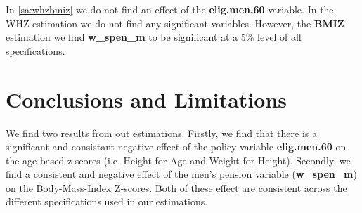 \begin{refsection}
In \autoref{sa:whzbmiz} we do not find an effect of the \textbf{elig.men.60} variable.
In the WHZ estimation we do not find any significant variables.
However, the \textbf{BMIZ} estimation we find \textbf{w\_spen\_m} to be significant at a 5\% level of all specifications.


\section{Conclusions and Limitations}
We find two results from out estimations.
Firstly, we find that there is a significant and consistant negative effect of the policy variable \textbf{elig.men.60} on the age-based z-scores
(i.e. Height for Age and Weight for Height).
Secondly, we find a consistent and negative effect of the men's pension variable (\textbf{w\_spen\_m}) on the Body-Mass-Index Z-scores.
Both of these effect are consistent across the different specifications used in our estimations.

\printbibliography
\end{refsection}